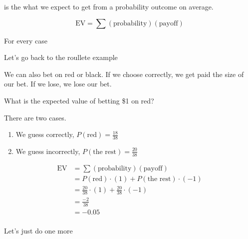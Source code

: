 \documentclass[../../Main.tex]{subfiles}
\begin{document}
\begin{definition}
     is the what we expect to get from a probability outcome on average.

    $$\text{EV} = \sum (\text{probability})(\text{payoff})$$

    For every case
\end{definition}

\begin{example}
    Let's go back to the roullete example

    We can also bet on red or black. If we choose correctly, we get paid the size of our bet. If we lose, we lose our bet.

    What is the expected value of betting \$1 on red?

    There are two cases.

    \begin{enumerate}
        \item We guess correctly, $P(\text{red}) = \frac{18}{38}$
        \item We guess incorrectly, $P(\text{the rest}) = \frac{20}{38}$
    \end{enumerate}

    \begin{align*}
        \text{EV} &= \sum (\text{probability})(\text{payoff}) \\
        &= P(\text{red}) \cdot (1) + P(\text{the rest}) \cdot (-1) \\
        &= \frac{20}{38} \cdot (1) + \frac{20}{38} \cdot (-1) \\
        &= \frac{-2}{38} \\
        &= \boxed{-0.05} \\
    \end{align*}

\end{example}

Let's just do one more
\end{document}
